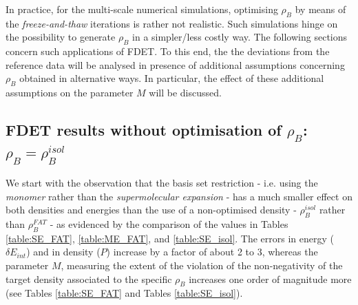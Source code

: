 \documentclass[amsmath,amssymb,preprint,aip,jcp]{revtex4-1}
\begin{document}
In practice, for the multi-scale numerical simulations, optimising 
$\rho_B$ by means of the {\it freeze-and-thaw} iterations is rather not realistic. Such simulations hinge on the possibility to generate $\rho_B$ 
in a simpler/less costly way. 
The following sections concern such applications of FDET. 
To this end, the the deviations from the reference data will be analysed in presence of additional assumptions concerning $\rho_B$ obtained in alternative ways. In particular, the effect of these additional assumptions on the parameter $M$ will be discussed.
\subsection{FDET results without optimisation of $\rho_B$: $\rho_B=\rho_B^{isol}$}
We start with the observation that the basis set restriction - i.e. using the {\it monomer} rather than the {\it supermolecular expansion} - has a much smaller effect on both densities and energies than the use of a non-optimised density - $\rho_B^{isol}$ rather than $\rho_B^{FAT}$ - as evidenced by the comparison of the values in Tables \ref{table:SE_FAT}, \ref{table:ME_FAT}, and \ref{table:SE_isol}.
The errors in energy ($\delta E_{int}$) and in density ($P$) increase by a factor of about 2 to 3, whereas the parameter $M$, measuring the extent of the violation of the non-negativity of the target density associated to the specific $\rho_B$ increases one order of magnitude more (see Tables \ref{table:SE_FAT} and Tables \ref{table:SE_isol}). 
\end{document}
